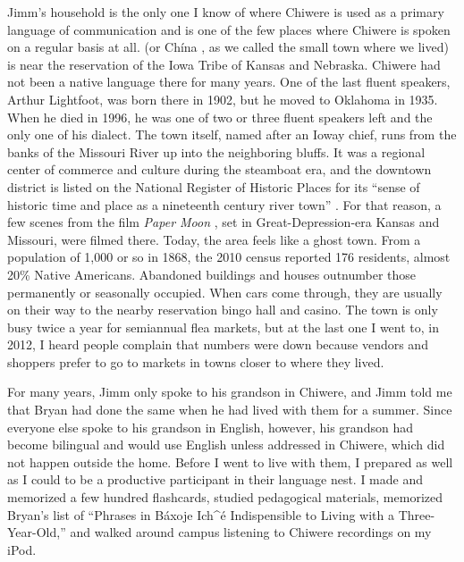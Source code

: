 \documentclass[output=paper]{LSP/langsci}
\begin{document}
Jimm's household is the only one I know of where Chiwere is used as a primary language of communication and is one of the few places where Chiwere is spoken on a regular basis at all.  (or Chína , as we called the small town where we lived) is near the reservation of the Iowa Tribe of Kansas and Nebraska. Chiwere had not been a native language there for many years. One of the last fluent speakers, Arthur Lightfoot, was born there in 1902, but he moved to Oklahoma in 1935. When he died in 1996, he was one of two or three fluent speakers left and the only one of his dialect. The town itself, named after an Ioway chief, runs from the banks of the Missouri River up into the neighboring bluffs. It was a regional center of commerce and culture during the steamboat era, and the downtown district is listed on the National Register of Historic Places for its ``sense of historic time and place as a nineteenth century river town'' \citep[1]{Wolfenbarger1996}. For that reason, a few scenes from the film \emph{Paper Moon} \citep{Bogdanovich1973}, set in Great-Depression-era Kansas and Missouri, were filmed there. Today, the area feels like a ghost town. From a population of 1,000 or so in 1868, the 2010 census reported 176 residents, almost 20\% Native Americans. Abandoned buildings and houses outnumber those permanently or seasonally occupied. When cars come through, they are usually on their way to the nearby reservation bingo hall and casino. The town is only busy twice a year for semiannual flea markets, but at the last one I went to, in 2012, I heard people complain that numbers were down because vendors and shoppers prefer to go to markets in towns closer to where they lived.

For many years, Jimm only spoke to his grandson in Chiwere, and Jimm told me that Bryan had done the same when he had lived with them for a summer. Since everyone else spoke to his grandson in English, however, his grandson had become bilingual and would use English unless addressed in Chiwere, which did not happen outside the home. Before I went to live with them, I prepared as well as I could to be a productive participant in their language nest. I made and memorized a few hundred flashcards, studied pedagogical materials, memorized Bryan's list of ``Phrases in Báxoje Ich\^{ }é Indispensible to Living with a Three-Year-Old,'' and walked around campus listening to Chiwere recordings on my iPod.
\end{document}
